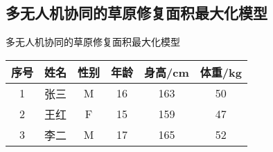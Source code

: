\documentclass{ctexbeamer}
\begin{document}
\subsection{多无人机协同的草原修复面积最大化模型}
\begin{frame}{多无人机协同的草原修复面积最大化模型}
    \begin{tabular}{cccccc}
   \toprule
   序号 & 姓名 & 性别 & 年龄 & 身高/cm & 体重/kg \\
   \midrule
   1 & 张三 & M & 16 & 163 & 50 \\
   2 & 王红 & F & 15 & 159 & 47 \\
   3 & 李二 & M & 17 & 165 & 52 \\
   \bottomrule
\end{tabular}
\end{frame}
\end{document}
